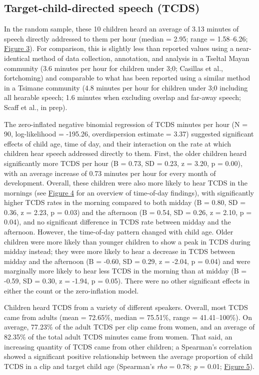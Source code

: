 \documentclass[,man,floatsintext]{apa6}
\begin{document}
\subsection{Target-child-directed speech
(TCDS)}\label{target-child-directed-speech-tcds}

In the random sample, these 10 children heard an average of 3.13 minutes
of speech directly addressed to them per hour (median = 2.95; range =
1.58--6.26; \protect\hyperlink{fig3}{Figure 3}). For comparison, this is
slightly less than reported values using a near-identical method of data
collection, annotation, and analysis in a Tseltal Mayan community (3.6
minutes per hour for children under 3;0; Casillas et al., fortchoming)
and comparable to what has been reported using a similar method in a
Tsimane community (4.8 minutes per hour for children under 3;0 including
all hearable speech; 1.6 minutes when excluding overlap and far-away
speech; Scaff et al., in prep).

The zero-inflated negative binomial regression of TCDS minutes per hour
(N = 90, log-likelihood = -195.26, overdispersion estimate = 3.37)
suggested significant effects of child age, time of day, and their
interaction on the rate at which children hear speech addressed directly
to them. First, the older children heard significantly more TCDS per
hour (B = 0.73, SD = 0.23, z = 3.20, p = 0.00), with an average increase
of 0.73 minutes per hour for every month of development. Overall, these
children were also more likely to hear TCDS in the mornings (see
\protect\hyperlink{fig4}{Figure 4} for an overview of time-of-day
findings), with significantly higher TCDS rates in the morning compared
to both midday (B = 0.80, SD = 0.36, z = 2.23, p = 0.03) and the
afternoon (B = 0.54, SD = 0.26, z = 2.10, p = 0.04), and no significant
difference in TCDS rate between midday and the afternoon. However, the
time-of-day pattern changed with child age. Older children were more
likely than younger children to show a peak in TCDS during midday
instead; they were more likely to hear a decrease in TCDS between midday
and the afternoon (B = -0.60, SD = 0.29, z = -2.04, p = 0.04) and were
marginally more likely to hear less TCDS in the morning than at midday
(B = -0.59, SD = 0.30, z = -1.94, p = 0.05). There were no other
significant effects in either the count or the zero-inflation model.

Children heard TCDS from a variety of different speakers. Overall, most
TCDS came from adults (mean = 72.65\%, median = 75.51\%, range =
41.41--100\%). On average, 77.23\% of the adult TCDS per clip came from
women, and an average of 82.35\% of the total adult TCDS minutes came
from women. That said, an increasing quantity of TCDS came from other
children; a Spearman's correlation showed a significant positive
relationship between the average proportion of child TCDS in a clip and
target child age (Spearman's \emph{rho} = 0.78; \emph{p} = 0.01;
\protect\hyperlink{fig5}{Figure 5}).
\end{document}
